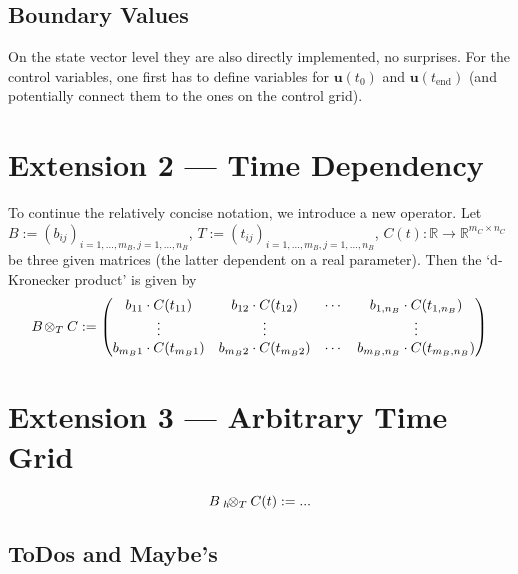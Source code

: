 \documentclass{article}
\newcommand{\defeq}{\mathrel{:=}}%
\newcommand{\kron}{\otimes}%
\newcommand{\dkron}[2][]{\mathbin{{}_{#1}\negthinspace\kron_{#2}}}%
\newcommand{\setR}{\mathbb{R}}%
\newcommand{\vectorfont}[1]{\boldsymbol{#1}}%
\newcommand{\uvec}{\vectorfont{u}}
\begin{document}
%
\subsection*{Boundary Values}
%
On the state vector level they are also directly implemented, no surprises.
For the control variables, one first has to define variables for $\uvec(t_0)$ and $\uvec(t_{\mathrm{end}})$ (and potentially connect them to the ones on the control grid).



%
\newpage

\section*{Extension 2 --- Time Dependency}

To continue the relatively concise notation, we introduce a new operator.
Let $B \defeq (b_{ij})_{i=1,\ldots,m_B, j=1,\ldots,n_B}$, $T \defeq (t_{ij})_{i=1,\ldots,m_B, j=1,\ldots,n_B}$, $C(t) %
\colon \setR \to \setR^{m_C \times n_C}$ be three given matrices (the latter dependent on a real parameter).
Then the `d-Kronecker product' is given by
\[
B \dkron{T} C \defeq \begin{pmatrix}
 b_{11} \cdot C(t_{11}) & b_{12}\cdot C(t_{12}) & \cdots & b_{1,n_B} \cdot C(t_{1,n_B}) \\
 \vdots                 & \vdots                &        & \vdots                       \\
 b_{m_B1} \cdot C(t_{m_B1}) & b_{m_B2}\cdot C(t_{m_B2}) & \cdots & b_{m_B,n_B} \cdot C(t_{m_B,n_B}) \\
\end{pmatrix}
\]

%

\section*{Extension 3 --- Arbitrary Time Grid}

\[
B \dkron[h]{T} C(t) \defeq ...
\]

\appendix

\subsection*{ToDos and Maybe's}
\end{document}
